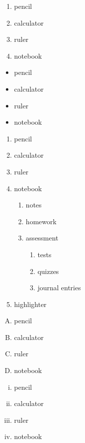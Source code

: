 \documentclass[11pt]{article}
\begin{document}
\begin{enumerate}
\item pencil
\item calculator
\item ruler
\item notebook
\end{enumerate}

\begin{itemize}
\item pencil
\item calculator
\item ruler
\item notebook
\end{itemize}

\begin{enumerate}
\item pencil
\item calculator
\item ruler
\item notebook
  \begin{enumerate}
  \item notes
  \item homework
  \item assessment
  	\begin{enumerate}
  	\item tests
  	\item quizzes
  	\item journal entries
  	\end{enumerate}
  \end{enumerate}
\item highlighter
\end{enumerate}

\vspace{2cm}

\begin{enumerate}[A.]
\item pencil
\item calculator
\item ruler
\item notebook
\end{enumerate}

\vspace{2cm}

\begin{enumerate}[i.]
\item pencil
\item calculator
\item ruler
\item notebook
\end{enumerate}
\end{document}

